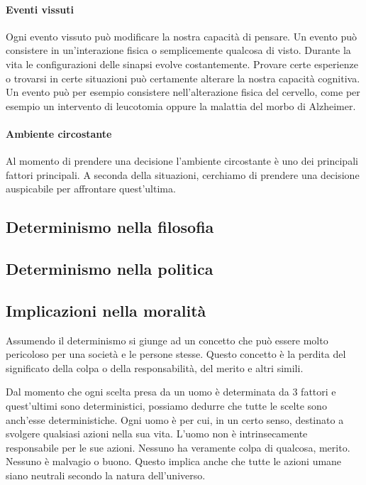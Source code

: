 \documentclass[a4paper, 12pt]{article}
\begin{document}
\paragraph{Eventi vissuti}
Ogni evento vissuto può modificare la nostra capacità di pensare.
Un evento può consistere in un'interazione fisica o semplicemente qualcosa di visto.
Durante la vita le configurazioni delle sinapsi evolve costantemente. Provare certe esperienze
o trovarsi in certe situazioni può certamente alterare la nostra capacità cognitiva.
Un evento può per esempio consistere nell'alterazione fisica del cervello, come per esempio
un intervento di leucotomia oppure la malattia del morbo di Alzheimer.

\paragraph{Ambiente circostante}
Al momento di prendere una decisione l'ambiente circostante è uno dei principali fattori
principali. A seconda della situazioni, cerchiamo di prendere una decisione auspicabile
per affrontare quest'ultima.

\subsection{Determinismo nella filosofia}

\subsection{Determinismo nella politica}

\subsection{Implicazioni nella moralità}

Assumendo il determinismo si giunge ad un concetto che può essere molto pericoloso per una società
e le persone stesse. Questo concetto è la perdita del significato della colpa o della responsabilità, del merito e altri simili.

Dal momento che ogni scelta presa
da un uomo è determinata da 3 fattori e
quest'ultimi sono deterministici, possiamo
dedurre che tutte le scelte sono
anch'esse deterministiche.
Ogni uomo è per cui, in un certo senso, destinato a
svolgere qualsiasi azioni nella sua vita.
L'uomo non è intrinsecamente responsabile
per le sue azioni. Nessuno ha veramente colpa di qualcosa,
merito. Nessuno è malvagio o buono. Questo
implica anche che tutte le azioni umane siano
neutrali secondo la natura dell'universo.
\end{document}
